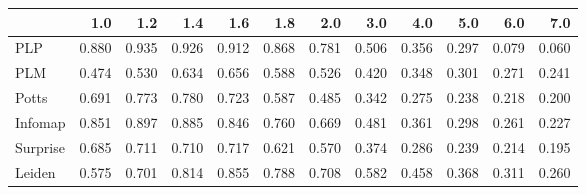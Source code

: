 \begin{tabular}{lrrrrrrrrrrr}
\toprule
{} &   1.0 &   1.2 &   1.4 &   1.6 &   1.8 &   2.0 &   3.0 &   4.0 &   5.0 &   6.0 &   7.0 \\
\midrule
PLP      & 0.880 & 0.935 & 0.926 & 0.912 & 0.868 & 0.781 & 0.506 & 0.356 & 0.297 & 0.079 & 0.060 \\
PLM      & 0.474 & 0.530 & 0.634 & 0.656 & 0.588 & 0.526 & 0.420 & 0.348 & 0.301 & 0.271 & 0.241 \\
Potts    & 0.691 & 0.773 & 0.780 & 0.723 & 0.587 & 0.485 & 0.342 & 0.275 & 0.238 & 0.218 & 0.200 \\
Infomap  & 0.851 & 0.897 & 0.885 & 0.846 & 0.760 & 0.669 & 0.481 & 0.361 & 0.298 & 0.261 & 0.227 \\
Surprise & 0.685 & 0.711 & 0.710 & 0.717 & 0.621 & 0.570 & 0.374 & 0.286 & 0.239 & 0.214 & 0.195 \\
Leiden   & 0.575 & 0.701 & 0.814 & 0.855 & 0.788 & 0.708 & 0.582 & 0.458 & 0.368 & 0.311 & 0.260 \\
\bottomrule
\end{tabular}
